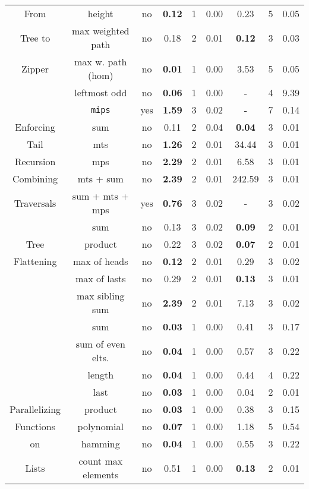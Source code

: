 \begin{table}
{\begin{tabular}[h]{|c|c|c|c|c|c||c|c|c|}
			From  & height & no & {\bfseries 0.12} & 1 & 0.00 & 0.23 & 5 & 0.05\\ 
			Tree to & max weighted path & no & 0.18 & 2 & 0.01 & {\bfseries 0.12} & 3 & 0.03\\ 
			Zipper & max w. path (hom) & no & {\bfseries 0.01} & 1 & 0.00 & 3.53 & 5 & 0.05\\ 
			 & leftmost odd & no & {\bfseries 0.06} & 1 & 0.00 & - & 4 & 9.39\\ 
			 & {\tt mips} & yes & {\bfseries 1.59} & 3 & 0.02 & - & 7 & 0.14\\ 
			\hline
			Enforcing & sum & no & 0.11 & 2 & 0.04 & {\bfseries 0.04} & 3 & 0.01\\ 
			Tail & mts & no & {\bfseries 1.26} & 2 & 0.01 & 34.44 & 3 & 0.01\\ 
			Recursion & mps & no & {\bfseries 2.29} & 2 & 0.01 & 6.58 & 3 & 0.01\\ 
			\hline
			Combining & mts + sum & no & {\bfseries 2.39} & 2 & 0.01 & 242.59 & 3 & 0.01\\ 
			Traversals & sum + mts + mps & yes & {\bfseries 0.76} & 3 & 0.02 & - & 3 & 0.02\\ 
			\hline
			 & sum & no & 0.13 & 3 & 0.02 & {\bfseries 0.09} & 2 & 0.01\\ 
			Tree & product & no & 0.22 & 3 & 0.02 & {\bfseries 0.07} & 2 & 0.01\\ 
			Flattening & max of heads & no & {\bfseries 0.12} & 2 & 0.01 & 0.29 & 3 & 0.02\\ 
			 & max of lasts & no & 0.29 & 2 & 0.01 & {\bfseries 0.13} & 3 & 0.01\\ 
			 & max sibling sum & no & {\bfseries 2.39} & 2 & 0.01 & 7.13 & 3 & 0.02\\ 
			\hline
			 & sum & no & {\bfseries 0.03} & 1 & 0.00 & 0.41 & 3 & 0.17\\ 
			 & sum of even elts. & no & {\bfseries 0.04} & 1 & 0.00 & 0.57 & 3 & 0.22\\ 
			 & length & no & {\bfseries 0.04} & 1 & 0.00 & 0.44 & 4 & 0.22\\ 
			 & last & no & {\bfseries 0.03} & 1 & 0.00 & 0.04 & 2 & 0.01\\ 
			Parallelizing & product & no & {\bfseries 0.03} & 1 & 0.00 & 0.38 & 3 & 0.15\\ 
			Functions & polynomial & no & {\bfseries 0.07} & 1 & 0.00 & 1.18 & 5 & 0.54\\ 
			on & hamming & no & {\bfseries 0.04} & 1 & 0.00 & 0.55 & 3 & 0.22\\ 
			Lists & count max elements & no & 0.51 & 1 & 0.00 & {\bfseries 0.13} & 2 & 0.01\\ 

\end{tabular}}
\end{table}
